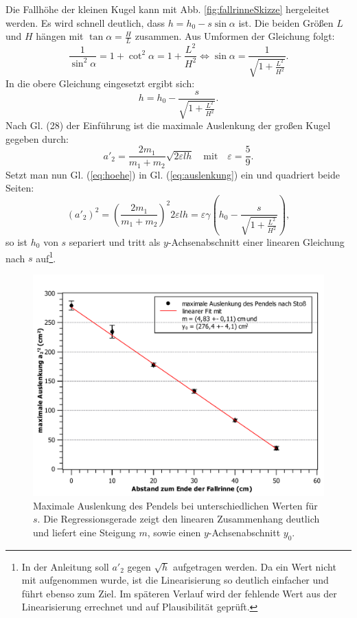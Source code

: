 	Die Fallhöhe der kleinen Kugel kann mit Abb. \ref{fig:fallrinneSkizze} hergeleitet werden.
	Es wird schnell deutlich, dass $h = h_0 - s \sin \alpha$ ist.
	Die beiden Größen $L$ und $H$ hängen mit $\tan \alpha = \frac{H}{L}$ zusammen.
	Aus Umformen der Gleichung folgt:
	\begin{equation}
		\frac{1}{\sin^2 \alpha} = 1 + \cot^2 \alpha = 1 + \frac{L^2}{H^2} \Leftrightarrow \sin \alpha = \frac{1}{\sqrt{1 + 	\frac{L^2}{H^2}}}.
	\end{equation}
	In die obere Gleichung eingesetzt ergibt sich: 
	\begin{equation}
		\label{eq:hoehe}
		h = h_0 - \frac{s}{\sqrt{1 + \frac{L^2}{H^2}}}.
	\end{equation}
	Nach Gl. (28) der Einführung ist die maximale Auslenkung der großen Kugel gegeben durch:
	\begin{equation}
		\label{eq:auslenkung}
		a'_2 = \frac{2 m_1}{m_1 + m_2} \sqrt{2 \varepsilon l h} \quad \text{mit} \quad \varepsilon = \frac{5}{9}.
	\end{equation}
	Setzt man nun Gl. (\ref{eq:hoehe}) in Gl. (\ref{eq:auslenkung}) ein und quadriert beide Seiten:
	\begin{equation}
		\label{eq:auslenkung2}
		(a'_2)^2 = \left( \frac{2 m_1}{m_1 + m_2}\right) ^2 2 \varepsilon l h = \varepsilon\gamma \left( h_0 - \frac{s}{\sqrt{1 + \frac{L^2}{H^2}}}\right),
	\end{equation}
	so ist $h_0$ von $s$ separiert und tritt als $y$-Achsenabschnitt einer linearen Gleichung nach $s$ auf\footnote{In der Anleitung soll $a'_2$ gegen $\sqrt{h}$ aufgetragen werden. Da ein Wert nicht mit aufgenommen wurde, ist die Linearisierung so deutlich einfacher und führt ebenso zum Ziel. Im späteren Verlauf wird der fehlende Wert aus der Linearisierung errechnet und auf Plausibilität geprüft.}.
	
	\begin{figure}[ht]
		\centering
		\includegraphics[width=\textwidth]{AuslenkungProAbstand.pdf}
		\caption{Maximale Auslenkung des Pendels bei unterschiedlichen Werten für $s$. Die Regressionsgerade zeigt den linearen Zusammenhang deutlich und liefert eine Steigung $m$, sowie einen $y$-Achsenabschnitt $y_0$.}
		\label{fig:fallrinneAuslenkung}	
	\end{figure}

